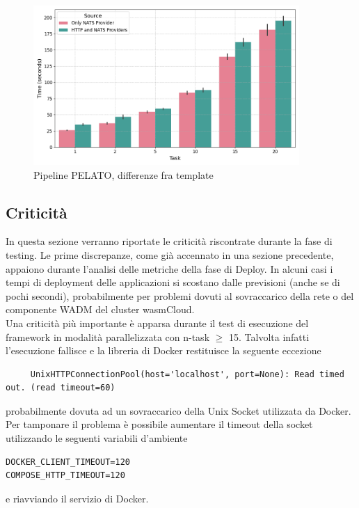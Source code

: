 \FloatBarrier
\begin{figure}[ht!]
    \centering
    \includegraphics[width=0.9\textwidth]{img/plots/total_time_providers_barplot.png}
    \caption{Pipeline PELATO, differenze fra template}
    \label{fig:test_provider_total}
\end{figure}
\FloatBarrier

\subsection{Criticità}

In questa sezione verranno riportate le criticità riscontrate durante la fase di testing. Le prime discrepanze, come già accennato in una sezione precedente, appaiono durante l'analisi delle metriche della fase di Deploy. In alcuni casi i tempi di deployment delle applicazioni si scostano dalle previsioni (anche se di pochi secondi), probabilmente per problemi dovuti al sovraccarico della rete o del componente WADM del cluster wasmCloud.\\
Una criticità più importante è apparsa durante il test di esecuzione del framework in modalità parallelizzata con n-task \(\geq\) 15. Talvolta infatti l'esecuzione fallisce e la libreria di Docker restituisce la seguente eccezione
\begin{lstlisting}
     UnixHTTPConnectionPool(host='localhost', port=None): Read timed out. (read timeout=60)
\end{lstlisting}
probabilmente dovuta ad un sovraccarico della Unix Socket utilizzata da Docker. Per tamponare il problema è possibile aumentare il timeout della socket utilizzando le seguenti variabili d'ambiente
\begin{lstlisting}
DOCKER_CLIENT_TIMEOUT=120
COMPOSE_HTTP_TIMEOUT=120
\end{lstlisting}
e riavviando il servizio di Docker.

